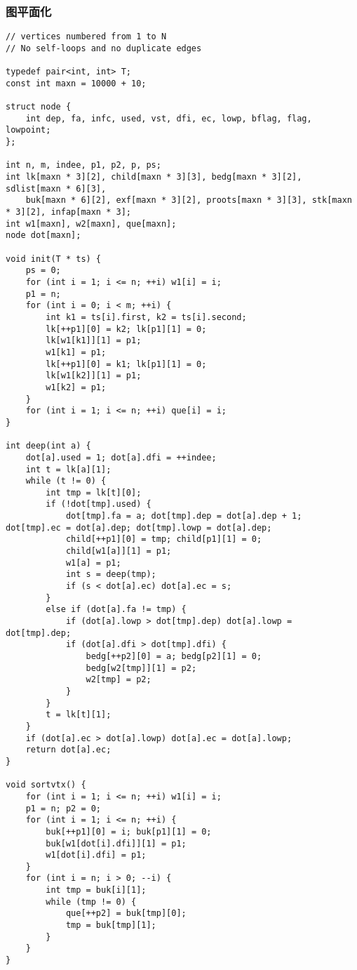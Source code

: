 \subsubsection{图平面化}
\begin{verbatim}
// vertices numbered from 1 to N
// No self-loops and no duplicate edges

typedef pair<int, int> T;
const int maxn = 10000 + 10;

struct node {
    int dep, fa, infc, used, vst, dfi, ec, lowp, bflag, flag, lowpoint;
};

int n, m, indee, p1, p2, p, ps;
int lk[maxn * 3][2], child[maxn * 3][3], bedg[maxn * 3][2], sdlist[maxn * 6][3], 
    buk[maxn * 6][2], exf[maxn * 3][2], proots[maxn * 3][3], stk[maxn * 3][2], infap[maxn * 3];
int w1[maxn], w2[maxn], que[maxn];
node dot[maxn];

void init(T * ts) {
    ps = 0;
    for (int i = 1; i <= n; ++i) w1[i] = i;
    p1 = n;
    for (int i = 0; i < m; ++i) {
        int k1 = ts[i].first, k2 = ts[i].second;
        lk[++p1][0] = k2; lk[p1][1] = 0;
        lk[w1[k1]][1] = p1;
        w1[k1] = p1;
        lk[++p1][0] = k1; lk[p1][1] = 0;
        lk[w1[k2]][1] = p1;
        w1[k2] = p1;
    }
    for (int i = 1; i <= n; ++i) que[i] = i;
}

int deep(int a) {
    dot[a].used = 1; dot[a].dfi = ++indee;
    int t = lk[a][1];
    while (t != 0) {
        int tmp = lk[t][0];
        if (!dot[tmp].used) {
            dot[tmp].fa = a; dot[tmp].dep = dot[a].dep + 1; dot[tmp].ec = dot[a].dep; dot[tmp].lowp = dot[a].dep;
            child[++p1][0] = tmp; child[p1][1] = 0;
            child[w1[a]][1] = p1;
            w1[a] = p1;
            int s = deep(tmp);
            if (s < dot[a].ec) dot[a].ec = s;
        }
        else if (dot[a].fa != tmp) {
            if (dot[a].lowp > dot[tmp].dep) dot[a].lowp = dot[tmp].dep;
            if (dot[a].dfi > dot[tmp].dfi) {
                bedg[++p2][0] = a; bedg[p2][1] = 0;
                bedg[w2[tmp]][1] = p2;
                w2[tmp] = p2;
            }
        }
        t = lk[t][1];
    }
    if (dot[a].ec > dot[a].lowp) dot[a].ec = dot[a].lowp;
    return dot[a].ec;
}

void sortvtx() {
    for (int i = 1; i <= n; ++i) w1[i] = i;
    p1 = n; p2 = 0;
    for (int i = 1; i <= n; ++i) {
        buk[++p1][0] = i; buk[p1][1] = 0;
        buk[w1[dot[i].dfi]][1] = p1;
        w1[dot[i].dfi] = p1;
    }
    for (int i = n; i > 0; --i) {
        int tmp = buk[i][1];
        while (tmp != 0) {
            que[++p2] = buk[tmp][0];
            tmp = buk[tmp][1];
        }
    }
}


\end{verbatim}
